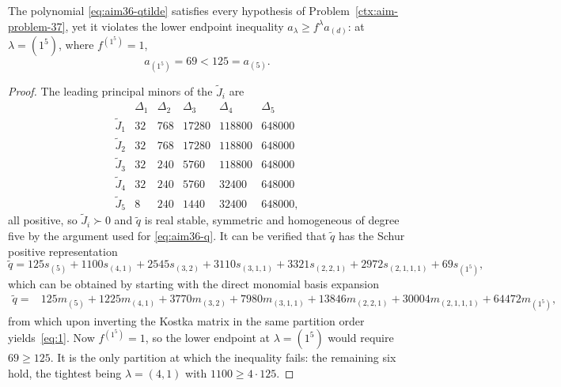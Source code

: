 \begin{cxrefutation}
\begin{theorem}\label{thm:aim37}
The polynomial \eqref{eq:aim36-qtilde} satisfies every hypothesis of Problem~\ref{ctx:aim-problem-37}, yet it violates the lower endpoint inequality $a_\lambda\ge f^\lambda a_{(d)}$: at $\lambda=(1^5)$, where $f^{(1^5)}=1$,
\[
a_{(1^5)}=69<125=a_{(5)}.
\]
\end{theorem}
\begin{proof}
The leading principal minors of the $\widetilde J_i$ are
\[
\begin{array}{c|rrrrr}
 &\Delta_1&\Delta_2&\Delta_3&\Delta_4&\Delta_5\\ \hline
\widetilde J_1&32&768&17280&118800&648000\\
\widetilde J_2&32&768&17280&118800&648000\\
\widetilde J_3&32&240&5760&118800&648000\\
\widetilde J_4&32&240&5760&32400&648000\\
\widetilde J_5&8&240&1440&32400&648000,
\end{array}
\]
all positive, so $\widetilde J_i\succ0$ and $\widetilde q$ is real stable, symmetric and homogeneous of degree five by the argument used for \eqref{eq:aim36-q}. It can be verified that $\widetilde{q}$ has the Schur positive representation
\begin{equation}
  \label{eq:1}
\widetilde{q}={}125s_{(5)}+1100s_{(4,1)}+2545s_{(3,2)}+3110s_{(3,1,1)}+3321s_{(2,2,1)}+2972s_{(2,1,1,1)}+69s_{(1^5)},
\end{equation}
which can be obtained by starting with the direct monomial basis expansion
\begin{align*}
\widetilde q={}&125m_{(5)}+1225m_{(4,1)}+3770m_{(3,2)}+7980m_{(3,1,1)}+13846m_{(2,2,1)}+30004m_{(2,1,1,1)}+64472m_{(1^5)},
\end{align*}
from which upon inverting the Kostka matrix in the same partition order yields~\eqref{eq:1}. Now $f^{(1^5)}=1$, so the lower endpoint at $\lambda=(1^5)$ would require $69\ge125$.  It is the only partition at which the inequality fails: the remaining six hold, the tightest being $\lambda=(4,1)$ with $1100\ge4\cdot125$.
\end{proof}


\end{cxrefutation}

